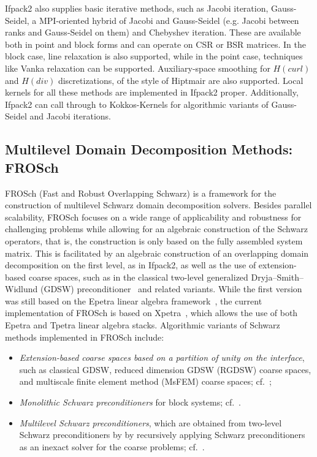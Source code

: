 Ifpack2 also supplies basic iterative methods, such as Jacobi
iteration, Gauss-Seidel, a MPI-oriented hybrid of Jacobi and
Gauss-Seidel (e.g. Jacobi between ranks and Gauss-Seidel on them) and
Chebyshev iteration.  These are available both in point and block
forms and can operate on CSR or BSR matrices.  In the block case,
line relaxation is also supported, while in the point case, techniques
like Vanka relaxation \cite{Vanka1986} can be supported.  Auxiliary-space
smoothing for $H(curl)$ and $H(div)$ discretizations, of the style of
Hiptmair \cite{Hiptmair1997} are also supported.
Local kernels for all these methods are
implemented in Ifpack2 proper.  Additionally, Ifpack2 can call through
to Kokkos-Kernels for algorithmic variants of Gauss-Seidel and Jacobi iterations.

\subsection{Multilevel Domain Decomposition Methods: FROSch}
\label{ssec:frosch}

FROSch (Fast and Robust Overlapping Schwarz) is a framework for the construction of multilevel Schwarz domain decomposition solvers. Besides parallel scalability, FROSch focuses on a wide range of applicability and robustness for challenging problems while allowing for an algebraic construction of the Schwarz operators, that is, the construction is only based on the fully assembled system matrix. This is facilitated by an algebraic construction of an overlapping domain decomposition on the first level, as in Ifpack2, as well as the use of extension-based coarse spaces, such as in the classical two-level generalized Dryja--Smith--Widlund (GDSW) preconditioner~\cite{dohrmann_domain_2008} and related variants. While the first version was still based on the Epetra linear algebra framework~\cite{heinlein_parallel_2016}, the current implementation of FROSch is based on Xpetra~\cite{heinlein_frosch_2020}, which allows the use of both Epetra and Tpetra linear algebra stacks. Algorithmic variants of Schwarz methods implemented in FROSch include:
\begin{itemize}
	\item \emph{Extension-based coarse spaces based on a partition of unity on the interface}, such as classical GDSW, reduced dimension GDSW (RGDSW) coarse spaces, and multiscale finite element method (MsFEM) coarse spaces; cf.~\cite{heinlein_parallel_2016,heinlein_improving_2018}; 
	\item \emph{Monolithic Schwarz preconditioners} for block systems; cf.~\cite{heinlein_monolithic_2019}.
	\item \emph{Multilevel Schwarz preconditioners}, which are obtained from two-level Schwarz preconditioners by by recursively applying Schwarz preconditioners as an inexact solver for the coarse problems; cf.~\cite{heinlein_parallel_2022}.
\end{itemize}

